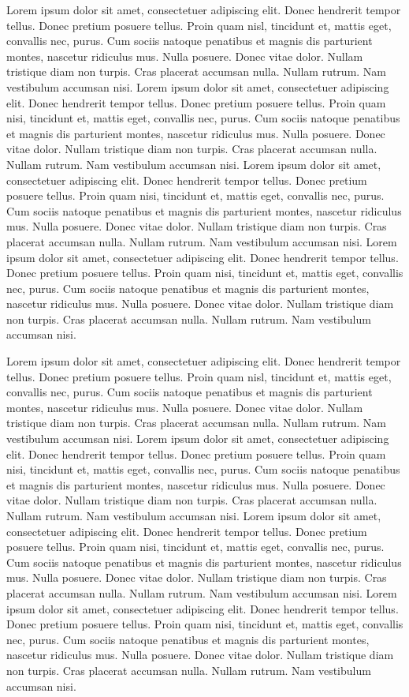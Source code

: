 \documentclass{book}
\begin{document}
Lorem ipsum dolor sit amet, consectetuer adipiscing elit. Donec hendrerit tempor tellus. Donec pretium posuere tellus. Proin quam nisl, tincidunt et, mattis eget, convallis nec, purus. Cum sociis natoque penatibus et magnis dis parturient montes, nascetur ridiculus mus. Nulla posuere. Donec vitae dolor. Nullam tristique diam non turpis. Cras placerat accumsan nulla. Nullam rutrum. Nam vestibulum accumsan nisi.  Lorem ipsum dolor sit amet, consectetuer adipiscing elit. Donec hendrerit tempor tellus. Donec pretium posuere tellus. Proin quam nisi, tincidunt et, mattis eget, convallis nec, purus. Cum sociis natoque penatibus et magnis dis parturient montes, nascetur ridiculus mus. Nulla posuere. Donec vitae dolor. Nullam tristique diam non turpis. Cras placerat accumsan nulla. Nullam rutrum. Nam vestibulum accumsan nisi.  Lorem ipsum dolor sit amet, consectetuer adipiscing elit. Donec hendrerit tempor tellus. Donec pretium posuere tellus. Proin quam nisi, tincidunt et, mattis eget, convallis nec, purus. Cum sociis natoque penatibus et magnis dis parturient montes, nascetur ridiculus mus. Nulla posuere. Donec vitae dolor. Nullam tristique diam non turpis. Cras placerat accumsan nulla. Nullam rutrum. Nam vestibulum accumsan nisi.   Lorem ipsum dolor sit amet, consectetuer adipiscing elit. Donec hendrerit tempor tellus. Donec pretium posuere tellus. Proin quam nisi, tincidunt et, mattis eget, convallis nec, purus. Cum sociis natoque penatibus et magnis dis parturient montes, nascetur ridiculus mus. Nulla posuere. Donec vitae dolor. Nullam tristique diam non turpis. Cras placerat accumsan nulla. Nullam rutrum. Nam vestibulum accumsan nisi.

Lorem ipsum dolor sit amet, consectetuer adipiscing elit. Donec hendrerit tempor tellus. Donec pretium posuere tellus. Proin quam nisl, tincidunt et, mattis eget, convallis nec, purus. Cum sociis natoque penatibus et magnis dis parturient montes, nascetur ridiculus mus. Nulla posuere. Donec vitae dolor. Nullam tristique diam non turpis. Cras placerat accumsan nulla. Nullam rutrum. Nam vestibulum accumsan nisi.  Lorem ipsum dolor sit amet, consectetuer adipiscing elit. Donec hendrerit tempor tellus. Donec pretium posuere tellus. Proin quam nisi, tincidunt et, mattis eget, convallis nec, purus. Cum sociis natoque penatibus et magnis dis parturient montes, nascetur ridiculus mus. Nulla posuere. Donec vitae dolor. Nullam tristique diam non turpis. Cras placerat accumsan nulla. Nullam rutrum. Nam vestibulum accumsan nisi.  Lorem ipsum dolor sit amet, consectetuer adipiscing elit. Donec hendrerit tempor tellus. Donec pretium posuere tellus. Proin quam nisi, tincidunt et, mattis eget, convallis nec, purus. Cum sociis natoque penatibus et magnis dis parturient montes, nascetur ridiculus mus. Nulla posuere. Donec vitae dolor. Nullam tristique diam non turpis. Cras placerat accumsan nulla. Nullam rutrum. Nam vestibulum accumsan nisi.   Lorem ipsum dolor sit amet, consectetuer adipiscing elit. Donec hendrerit tempor tellus. Donec pretium posuere tellus. Proin quam nisi, tincidunt et, mattis eget, convallis nec, purus. Cum sociis natoque penatibus et magnis dis parturient montes, nascetur ridiculus mus. Nulla posuere. Donec vitae dolor. Nullam tristique diam non turpis. Cras placerat accumsan nulla. Nullam rutrum. Nam vestibulum accumsan nisi.
\end{document}
